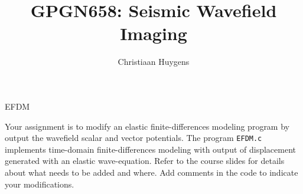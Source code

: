 \author{Christiaan Huygens}
\title{GPGN658: Seismic Wavefield Imaging}{EFDM}

Your assignment is to modify an elastic finite-differences modeling
program by output the wavefield scalar and vector potentials.  The
program \texttt{EFDM.c} implements time-domain finite-differences
modeling with output of displacement generated with an elastic
wave-equation. Refer to the course slides for details about what needs
to be added and where. Add comments in the code to indicate your
modifications.






%



